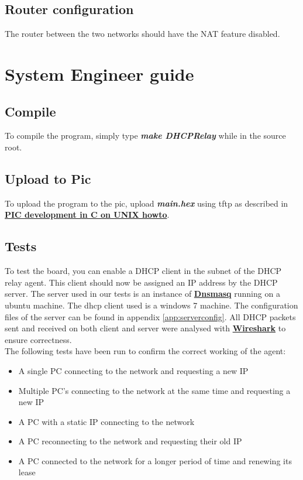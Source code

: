 \documentclass[11pt,a4paper]{scrartcl}
\begin{document}
\subsection{Router configuration}
The router between the two networks should have the NAT feature disabled.

\section{System Engineer guide}
\subsection{Compile}
To compile the program, simply type \textbf{\textit{make DHCPRelay}} while in the source root.

\subsection{Upload to Pic}
To upload the program to the pic, upload \textbf{\textit{main.hex}} using tftp as described in \href{http://www.foditic.org/SORTES\_14/missions/picUnixE.php}{\textbf{PIC development in C on UNIX howto}}.

\subsection{Tests}
To test the board, you can enable a DHCP client in the subnet of the DHCP relay agent. This client should now be assigned an IP address by the DHCP server. The server used in our tests is an instance of \href{http://www.thekelleys.org.uk/dnsmasq/doc.html}{\textbf{Dnsmasq}} running on a ubuntu machine. The dhcp client used is a windows 7 machine. The configuration files of the server can be found in appendix \ref{app:serverconfig}. All DHCP packets sent and received on both client and server were analysed with \href{https://www.wireshark.org/}{\textbf{Wireshark}} to ensure correctness. \\

The following tests have been run to confirm the correct working of the agent:
\begin{itemize}
\item A single PC connecting to the network and requesting a new IP
\item Multiple PC's connecting to the network at the same time and requesting a new IP
\item A PC with a static IP connecting to the network
\item A PC reconnecting to the network and requesting their old IP
\item A PC connected to the network for a longer period of time and renewing its lease
\end{itemize}
\end{document}
